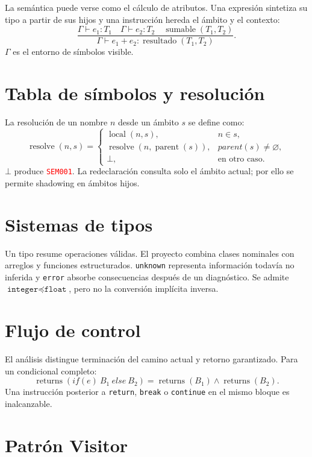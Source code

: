 \documentclass[11pt,letterpaper,oneside]{report}
\newcommand{\codigo}[1]{\texttt{#1}}
\newcommand{\diag}[1]{\textcolor{red}{\texttt{#1}}}
\begin{document}
La semántica puede verse como el cálculo de atributos. Una expresión sintetiza su
tipo a partir de sus hijos y una instrucción hereda el ámbito y el contexto:
\[
\frac{\Gamma\vdash e_1:T_1 \quad \Gamma\vdash e_2:T_2
      \quad \operatorname{sumable}(T_1,T_2)}
     {\Gamma\vdash e_1+e_2:\operatorname{resultado}(T_1,T_2)}.
\]
\(\Gamma\) es el entorno de símbolos visible.

\section{Tabla de símbolos y resolución}

La resolución de un nombre \(n\) desde un ámbito \(s\) se define como:
\[
\operatorname{resolve}(n,s)=
\begin{cases}
\operatorname{local}(n,s), & n\in s,\\
\operatorname{resolve}(n,\operatorname{parent}(s)), & parent(s)\neq\varnothing,\\
\bot, & \text{en otro caso}.
\end{cases}
\]
\(\bot\) produce \diag{SEM001}. La redeclaración consulta solo el ámbito actual; por
ello se permite shadowing en ámbitos hijos.

\section{Sistemas de tipos}

Un tipo resume operaciones válidas. El proyecto combina clases nominales con arreglos
y funciones estructurados. \codigo{unknown} representa información todavía no
inferida y \codigo{error} absorbe consecuencias después de un diagnóstico. Se admite
\(\codigo{integer}\preceq\codigo{float}\), pero no la conversión implícita inversa.

\section{Flujo de control}

El análisis distingue terminación del camino actual y retorno garantizado. Para un
condicional completo:
\[
\operatorname{returns}(if(e)\ B_1\ else\ B_2)
=\operatorname{returns}(B_1)\land\operatorname{returns}(B_2).
\]
Una instrucción posterior a \codigo{return}, \codigo{break} o \codigo{continue} en el
mismo bloque es inalcanzable.

\section{Patrón Visitor}
\end{document}
